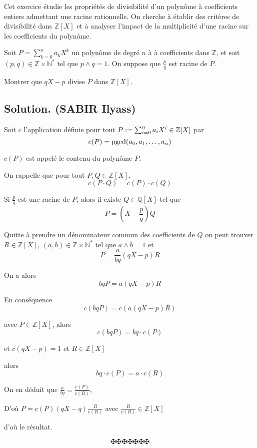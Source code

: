 Cet exercice {\'e}tudie les propri{\'e}t{\'e}s de divisibilit{\'e} d'un
polyn{\^o}me {\`a} coefficients entiers admettant une racine rationnelle. On
cherche {\`a} {\'e}tablir des crit{\`e}res de divisibilit{\'e} dans
$\mathbb{Z}[X]$ et {\`a} analyser l'impact de la multiplicit{\'e} d'une racine
sur les coefficients du polyn{\^o}me.
\begin{exercise}[]
Soit $P = \sum_{k = 0}^n a_k X^k$ un polyn{\^o}me de degr{\'e} $n$ {\`a} {\`a}
coefficients dans $\mathbb{Z}$, et soit $(p, q) \in \mathbb{Z} \times
\mathbb{N}^{\ast}$ tel que $p \wedge q = 1$. On suppose que $\frac{p}{q}$ est
racine de $P$.

Montrer que $qX - p$ divise $P$ dans $\mathbb{Z}[X]$.

\end{exercise}

\subsection*{Solution. (SABIR Ilyass)}

Soit $c$ l'application d{\'e}finie pour tout $P := \sum_{i = 0}^n a_i X^i
\in \mathbb{Z} [X]$ par
\[ c (P) = \operatorname{pgcd} (a_0, a_1, \ldots, a_n) \]


$c (P)$ est appel{\'e} le contenu du polyn{\^o}me $P$.

On rappelle que pour tout $P, Q \in \mathbb{Z}[X]$,
\[ c (P \cdot Q) = c (P) \cdot c (Q) \]


Si $\frac{p}{q}$ est une racine de $P$, alors il existe $Q \in \mathbb{Q}[X]$
tel que
\[ P = \left( X - \frac{p}{q} \right) Q \]


Quitte {\`a} prendre un d{\'e}nominateur commun des coefficients de $Q$ on
peut trouver $R \in \mathbb{Z}[X]$, $(a, b) \in \mathbb{Z} \times
\mathbb{N}^{\ast}$ tel que $a \wedge b = 1$ et
\[ P = \frac{a}{bq} (qX - p) R \]


On a alors
\[ bqP = a (qX - p) R \]


En cons{\'e}quence
\[ c (bqP) = c (a (qX - p) R) \]


avec $P \in \mathbb{Z}[X]$, alors $\text{}$
\[ c (bqP) = bq \cdot c (P) \]


et $c (qX - p) = 1$ et $R \in \mathbb{Z}[X]$

alors
\[ bq \cdot c (P) = a \cdot c (R) \]


On en d{\'e}duit que $\frac{a}{bq} = \frac{c (P)}{c (R)}$,

D'o{\`u} $P = c (P) (qX - q) \frac{R}{c (R)}$ avec $\frac{R}{c (R)} \in
\mathbb{Z}[X]$

d'o{\`u} le r{\'e}sultat.


\[ \maltese \maltese \maltese \maltese \maltese \maltese \maltese \]
